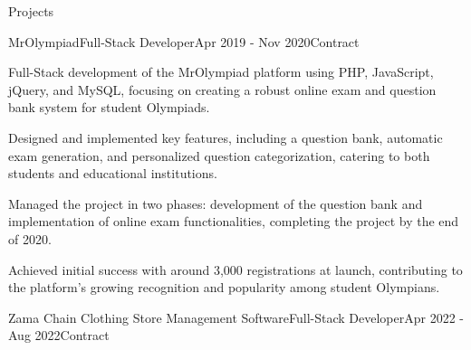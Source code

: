 \documentclass[]{kyvernitis-resume}
\begin{document}
\begin{section}{Projects}
    \begin{subsection}{MrOlympiad}{Full-Stack Developer}{Apr 2019 - Nov 2020}{Contract}{}
		\item Full-Stack development of the MrOlympiad platform using PHP, JavaScript, jQuery, and MySQL, focusing on creating a robust online exam and question bank system for student Olympiads.
		\item Designed and implemented key features, including a question bank, automatic exam generation, and personalized question categorization, catering to both students and educational institutions.
		\item Managed the project in two phases: development of the question bank and implementation of online exam functionalities, completing the project by the end of 2020.
		\item Achieved initial success with around 3,000 registrations at launch, contributing to the platform's growing recognition and popularity among student Olympians.
    \end{subsection}
    \begin{subsection}{Zama Chain Clothing Store Management Software}{Full-Stack Developer}{Apr 2022 - Aug 2022}{Contract}{}

\end{subsection}
\end{section}
\end{document}

